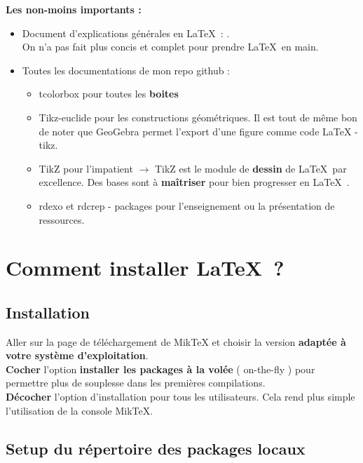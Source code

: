 \documentclass[a4paper,11pt,fleqn]{article}
\begin{document}
\textbf{Les non-moins importants :}\\

\begin{itemize}[label=\bccrayon]

	\item Document d'explications générales en \LaTeX\  : .\\On n'a pas fait plus concis et complet pour prendre \LaTeX\  en main.
	\item Toutes les documentations de mon repo github : \\
		\begin{itemize}[label=\faPen]
			\item tcolorbox pour toutes les \textbf{boites} 
			\item Tikz-euclide pour les constructions géométriques. Il est tout de même bon de noter que GeoGebra permet l'export d'une figure comme code LaTeX - tikz.
			\item TikZ pour l'impatient $\longrightarrow$ TikZ est le module de \textbf{dessin} de \LaTeX\  par excellence. Des bases sont à \textbf{maîtriser} pour bien progresser en \LaTeX\ . 
			\item rdexo et rdcrep - packages pour l'enseignement ou la présentation de ressources. 
		\end{itemize}
	
\end{itemize}	

\section{Comment installer \LaTeX\  ?}

\subsection{Installation}

Aller sur la page de téléchargement de MikTeX et choisir la version \textbf{adaptée à votre système d'exploitation}.\\
\textbf{Cocher} l'option \textbf{installer les packages à la volée} ( on-the-fly ) pour permettre plus de souplesse dans les premières compilations.\\
\textbf{Décocher} l'option d'installation pour tous les utilisateurs. Cela rend plus simple l'utilisation de la console MikTeX.


\subsection{Setup du répertoire des packages locaux}
\end{document}

